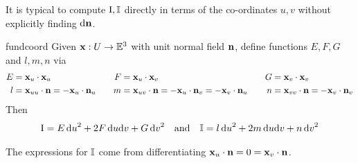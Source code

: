 \goodbreak

It is typical to compute $\I,\II$ directly in terms of the co-ordinates $u,v$ without explicitly finding $\dvn$.
 
\begin{thm}{}{fundcoord}
Given $\vx:U\to\E^3$ with unit normal field $\vn$, define functions $E,F,G$ and $l,m,n$ via
\begin{align*}
E&=\vx_u\cdot\vx_u &F&=\vx_u\cdot\vx_v &G&=\vx_v\cdot\vx_v\\
l&=\vx_{uu}\cdot\vn =-\vx_u\cdot\vn_u\quad &m&=\vx_{uv}\cdot\vn=-\vx_u\cdot\vn_v=-\vx_v\cdot\vn_u\quad &n&=\vx_{vv}\cdot \vn=-\vx_v\cdot\vn_v
\end{align*}
Then
\[\I=E\,\du^2+2F\,\du\dv+G\,\dv^2\quad\text{and}\quad \II =l\,\du^2+2m\,\du\dv+n\,\dv^2\]
\end{thm}

The expressions for $\II$ come from differentiating $\vx_u\cdot\vn=0=\vx_v\cdot\vn$.

